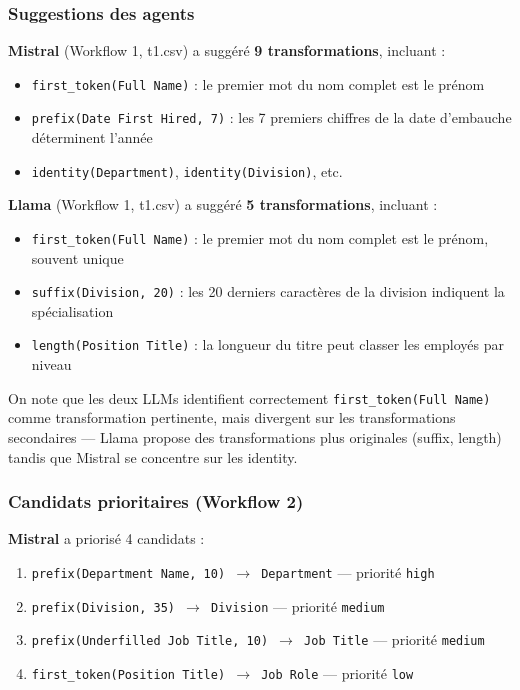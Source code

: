 \documentclass[12pt,a4paper]{article}
\begin{document}
\subsubsection{Suggestions des agents}

\textbf{Mistral} (Workflow 1, t1.csv) a sugg\'{e}r\'{e} \textbf{9 transformations}, incluant :
\begin{itemize}
    \item \texttt{first\_token(Full Name)} : \og{}le premier mot du nom complet est le pr\'{e}nom\fg{}
    \item \texttt{prefix(Date First Hired, 7)} : \og{}les 7 premiers chiffres de la date d'embauche d\'{e}terminent l'ann\'{e}e\fg{}
    \item \texttt{identity(Department)}, \texttt{identity(Division)}, etc.
\end{itemize}

\textbf{Llama} (Workflow 1, t1.csv) a sugg\'{e}r\'{e} \textbf{5 transformations}, incluant :
\begin{itemize}
    \item \texttt{first\_token(Full Name)} : \og{}le premier mot du nom complet est le pr\'{e}nom, souvent unique\fg{}
    \item \texttt{suffix(Division, 20)} : \og{}les 20 derniers caract\`{e}res de la division indiquent la sp\'{e}cialisation\fg{}
    \item \texttt{length(Position Title)} : \og{}la longueur du titre peut classer les employ\'{e}s par niveau\fg{}
\end{itemize}

On note que les deux LLMs identifient correctement \texttt{first\_token(Full Name)} comme transformation pertinente, mais divergent sur les transformations secondaires --- Llama propose des transformations plus originales (suffix, length) tandis que Mistral se concentre sur les identity.

\subsubsection{Candidats prioritaires (Workflow 2)}

\textbf{Mistral} a prioris\'{e} 4 candidats :
\begin{enumerate}
    \item \texttt{prefix(Department Name, 10) $\rightarrow$ Department} --- priorit\'{e} \texttt{high}
    \item \texttt{prefix(Division, 35) $\rightarrow$ Division} --- priorit\'{e} \texttt{medium}
    \item \texttt{prefix(Underfilled Job Title, 10) $\rightarrow$ Job Title} --- priorit\'{e} \texttt{medium}
    \item \texttt{first\_token(Position Title) $\rightarrow$ Job Role} --- priorit\'{e} \texttt{low}
\end{enumerate}
\end{document}
